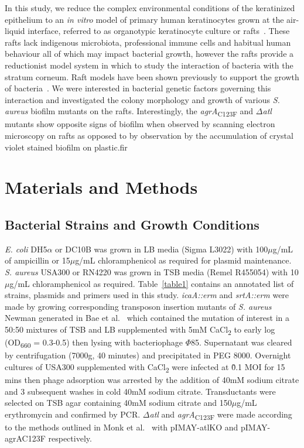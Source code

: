 \documentclass[10pt,letterpaper]{article}
\begin{document}
In this study, we reduce the complex environmental conditions of the keratinized epithelium to an \textit{in vitro} model of primary human keratinocytes grown at the air-liquid interface, referred to as organotypic keratinocyte culture or rafts~\cite{simpson_rna_2010}.
These rafts lack indigenous microbiota, professional immune cells and habitual human behaviour all of which may impact bacterial growth, however the rafts provide a reductionist model system in which to study the interaction of bacteria with the stratum corneum.
Raft models have been shown previously to support the growth of bacteria~\cite{breij_three-dimensional_2012, holland_microbial_2008, reijer_detection_2016}.
We were interested in bacterial genetic factors governing this interaction and investigated the colony morphology and growth of various \textit{S. aureus} biofilm mutants on the rafts.
Interestingly, the \textit{agrA}\textsubscript{C123F} and $\Delta$\textit{atl} mutants show opposite signs of biofilm when observed by scanning electron microscopy on rafts as opposed to by observation by the accumulation of crystal violet stained biofilm on plastic.fir

\section*{Materials and Methods}

\subsection*{Bacterial Strains and Growth Conditions}
\textit{E. coli} DH5$\alpha$ or DC10B was grown in LB media (Sigma L3022) with 100$\mu$g/mL of ampicillin or 15$\mu$g/mL chloramphenicol as required for plasmid maintenance.
\textit{S. aureus} USA300 or RN4220 was grown in TSB media (Remel R455054) with 10$\mu$g/mL chloramphenicol as required.
Table~\ref{table1} contains an annotated list of strains, plasmids and primers used in this study.
\textit{icaA::erm} and \textit{srtA::erm} were made by growing corresponding transposon insertion mutants of \textit{S. aureus} Newman generated in Bae et al.~\cite{bae_staphylococcus_2004} which contained the mutation of interest in a 50:50 mixtures of TSB and LB supplemented with 5mM CaCl\textsubscript{2} to early log (OD\textsubscript{660} = 0.3-0.5) then lysing with bacteriophage $\Phi$85.
Supernatant was cleared by centrifugation (7000g, 40 minutes) and precipitated in PEG 8000.
Overnight cultures of USA300 supplemented with CaCl\textsubscript{2} were infected at \~0.1 MOI for 15 mins then phage adsorption was arrested by the addition of 40mM sodium citrate and 3 subsequent washes in cold 40mM sodium citrate.
Transductants were selected on TSB agar containing 40mM sodium citrate and 150$\mu$g/mL erythromycin and confirmed by PCR.
$\Delta$\textit{atl} and \textit{agrA}\textsubscript{C123F} were made according to the methods outlined in Monk et al.~\cite{monk_transforming_2012} with pIMAY-atlKO and pIMAY-agrAC123F respectively.
\end{document}

